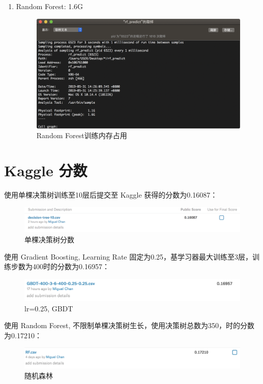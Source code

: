 \documentclass[12pt]{article}
\begin{document}
\begin{enumerate}
    \item Random Forest: 1.6G
    \begin{figure}[H]
        \centering
        \includegraphics[scale=0.44]{rf-memory.png}
        \caption{Random Forest训练内存占用}
        \label{}
    \end{figure}
\end{enumerate}

\section{Kaggle 分数}

使用单棵决策树训练至10层后提交至 Kaggle 获得的分数为0.16087：
\begin{figure}[H]
    \centering
    \includegraphics[scale=0.5]{single-tree-300-10-kaggle.png}
    \caption{单棵决策树分数}
    \label{}
\end{figure}

使用 Gradient Boosting, Learning Rate 固定为0.25，基学习器最大训练至3层，训练步数为400时的分数为0.16957：
\begin{figure}[H]
    \centering
    \includegraphics[scale=0.5]{gbdt-fixed-lr-kaggle.png}
    \caption{lr=0.25, GBDT}
    \label{}
\end{figure}

使用 Random Forest, 不限制单棵决策树生长，使用决策树总数为350，时的分数为0.17210：
\begin{figure}[H]
    \centering
    \includegraphics[scale=0.5]{RF-400-4-005-350.png}
    \caption{随机森林}
    \label{}
\end{figure}
\end{document}
